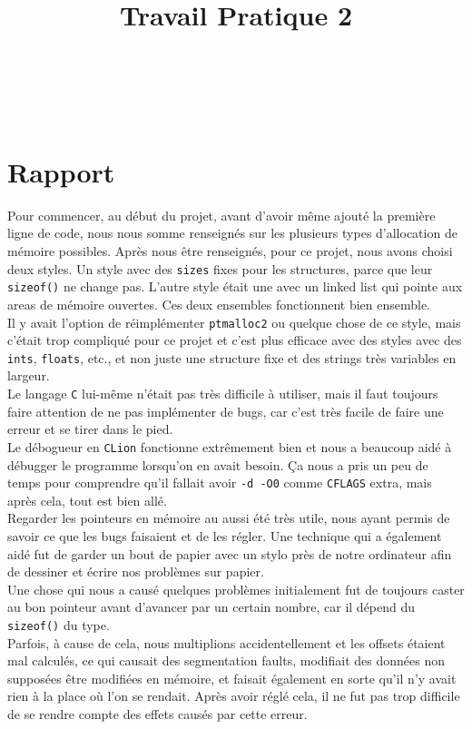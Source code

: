 \documentclass[10pt,a4paper]{article}
\title{Travail Pratique 2}
\author{
\nomcompletUn\\
\matriculeUn\\
\nomcompletDeux\\
\matriculeDeux
}
\date{}
\begin{document}
\maketitle

\section*{Rapport}

Pour commencer, au début du projet, avant d'avoir même ajouté la première ligne 
de code, nous nous somme renseignés sur les plusieurs types d'allocation de mémoire
possibles. Après nous être renseignés, pour ce projet, nous avons choisi deux styles. Un style avec des \texttt{sizes} fixes
pour les structures, parce que leur \texttt{sizeof()} ne change pas. L'autre style était une avec 
un linked list qui pointe aux areas de mémoire ouvertes. Ces deux ensembles 
fonctionnent bien ensemble.\\
Il y avait l'option de réimplémenter \texttt{ptmalloc2} ou
quelque chose de ce style, mais c'était trop compliqué pour ce projet et c'est plus
efficace avec des styles avec des \texttt{ints}, \texttt{floats}, etc., et non juste une structure fixe
et des strings très variables en largeur.\\

Le langage \texttt{C} lui-même n'était pas très difficile à utiliser, mais il faut toujours faire
attention de ne pas implémenter de bugs, car c'est très facile de faire une erreur et se tirer dans 
le pied.\\

Le débogueur en \texttt{CLion} fonctionne extrêmement bien et nous
a beaucoup aidé à débugger le programme lorsqu'on en avait besoin. Ça nous a pris un
peu de temps pour comprendre qu'il fallait avoir \texttt{-d -O0} comme \texttt{CFLAGS} extra, mais après cela,
tout est bien allé.\\

Regarder les pointeurs en mémoire au aussi été très utile, nous ayant permis de
savoir ce que les bugs faisaient et de les régler. Une technique qui a également aidé fut
de garder un bout de papier avec un stylo près de notre ordinateur afin de dessiner et 
écrire nos problèmes sur papier.\\

Une chose qui nous a causé quelques problèmes initialement fut
de toujours caster au bon pointeur avant d'avancer par un certain nombre,
car il dépend du \texttt{sizeof()} du type.\\
Parfois, à cause de cela, nous multiplions accidentellement
et les offsets étaient mal calculés, ce qui causait des segmentation faults,
modifiait des données non supposées être modifiées en mémoire, et faisait également en sorte qu'il
n'y avait rien à la place où l'on se rendait. Après avoir réglé cela, il ne fut pas trop
difficile de se rendre compte des effets causés par cette erreur.\\
\end{document}
